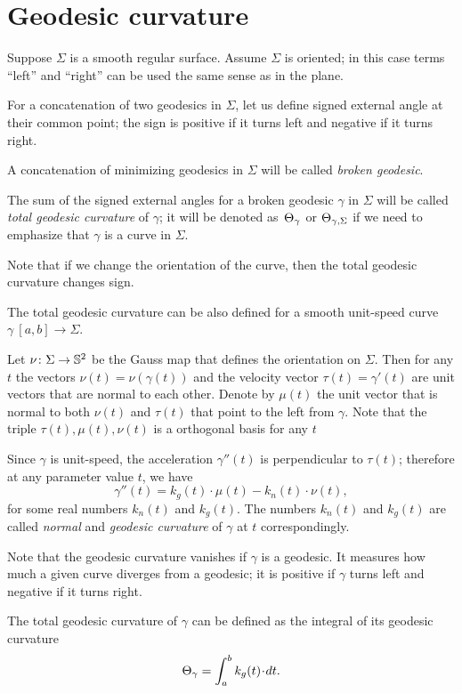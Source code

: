\section{Geodesic curvature}

Suppose $\Sigma$ is a smooth regular surface.
Assume $\Sigma$ is oriented;
in this case terms ``left'' and ``right'' can be used the same sense as in the plane.

For a concatenation of two geodesics in $\Sigma$, let us define signed external angle at their common point;
the sign is positive if it turns left and negative if it turns right. 

A concatenation of minimizing geodesics in $\Sigma$ will be called \emph{broken geodesic}.

The sum of the signed external angles for a broken geodesic $\gamma$ in $\Sigma$ will be called \emph{total geodesic curvature} of $\gamma$; it will be denoted as~$\Theta_{\gamma}$ or $\Theta_{\gamma,\Sigma}$ if we need to emphasize that $\gamma$ is a curve in $\Sigma$.

Note that if we change the orientation of the curve, then the total geodesic curvature changes sign.

The total geodesic curvature can be also defined for a smooth unit-speed curve $\gamma\:[a,b]\to\Sigma$.

Let $\nu\colon\Sigma\to \mathbb{S}^2$ be the Gauss map that defines the orientation on $\Sigma$.
Then for any $t$ the vectors $\nu(t)=\nu(\gamma(t))$ and the velocity vector $\tau(t)=\gamma'(t)$ are unit vectors that are normal to each other.
Denote by $\mu(t)$ the unit vector that is normal to both $\nu(t)$ and $\tau(t)$ that point to the left from $\gamma$.
Note that the triple $\tau(t),\mu(t),\nu(t)$ is a orthogonal basis for any $t$

Since $\gamma$ is unit-speed, the acceleration $\gamma''(t)$ is perpendicular to $\tau(t)$;
therefore at any parameter value $t$, we have
\[\gamma''(t)=k_g(t)\cdot \mu(t)-k_n(t)\cdot \nu(t),\]
for some real numbers $k_n(t)$ and $k_g(t)$.
The numbers $k_n(t)$ and $k_g(t)$ are called \emph{normal} and \emph{geodesic curvature} of $\gamma$ at $t$ correspondingly.

Note that the geodesic curvature vanishes if $\gamma$ is a geodesic. 
It measures how much a given curve diverges from a geodesic;
it is positive if $\gamma$ turns left and negative if it turns right.

The total geodesic curvature of $\gamma$ can be defined as the integral of its geodesic curvature
\[\tgc\gamma=\int_a^b k_g(t)\cdot dt.\]

